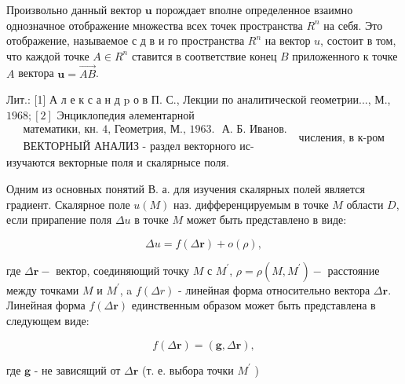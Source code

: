 \documentclass[10pt]{article}
\begin{document}
Произвольно данный вектор $\boldsymbol{u}$ порождает вполне определенное взаимно однозначное отображение множества всех точек пространства $R^{n}$ на себя. Это отображение, называемое с д в и го пространства $R^{n}$ на вектор $u$, состоит в том, что каждой точке $A \in R^{n}$ ставится в соответствие конец $B$ приложенного к точке $A$ вектора $\boldsymbol{u}=\overrightarrow{A B}$.



Лит.: [1] А л е к с а н д p о в П. С., Лекции по аналитической геометрии..., М., $1968 ;[2]$ Энциклопедия әлементарной $\begin{aligned} & \text { математики, кн. 4, Геометрия, М., 1963. } \text { А. Б. Иванов. } \\ & \text { ВЕКТОРНЫЙ АНАЛИЗ - раздел векторного ис- }\end{aligned}$ числения, в к-ром изучаются векторные поля и скалярнысе поля.



Одним из основных понятий В. а. для изучения скалярных полей является градиент. Скалярное поле $u(M)$ наз. дифференцируемым в точке $M$ области $D$, если прирапение поля $\Delta u$ в точке $M$ может быть представлено в виде:



\[

\Delta u=f(\Delta \boldsymbol{r})+o(\rho),

\]



где $\Delta \boldsymbol{r}-$ вектор, соединяющий точку $M$ с $M^{\prime}$, $\rho=\rho\left(M, M^{\prime}\right)-$ расстояние между точками $M$ и $M^{\prime}$, a $f(\Delta r)$ - линейная форма относительно вектора $\Delta \boldsymbol{r}$. Линейная форма $f(\Delta \boldsymbol{r})$ единственным образом может быть представлена в следующем виде:



\[

f(\Delta \boldsymbol{r})=(\boldsymbol{g}, \Delta \boldsymbol{r}),

\]



где $\boldsymbol{g}$ - не зависящий от $\Delta \boldsymbol{r}$ (т. е. выбора точки $M^{\prime}$ )
\end{document}
